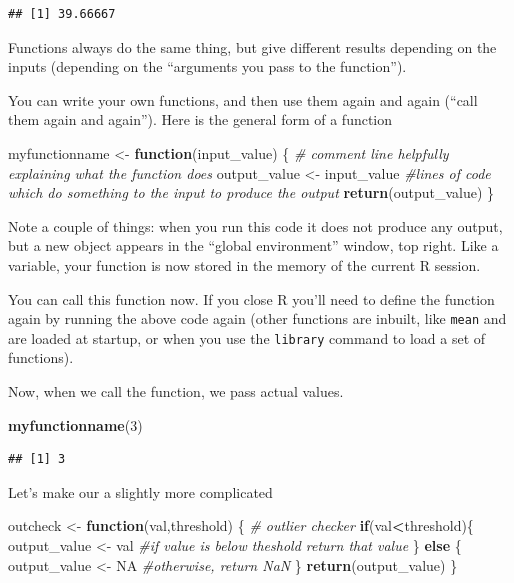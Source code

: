 \documentclass[]{book}
\newenvironment{Shaded}{\begin{snugshade}}{\end{snugshade}}
\newcommand{\KeywordTok}[1]{\textcolor[rgb]{0.13,0.29,0.53}{\textbf{#1}}}
\newcommand{\DecValTok}[1]{\textcolor[rgb]{0.00,0.00,0.81}{#1}}
\newcommand{\StringTok}[1]{\textcolor[rgb]{0.31,0.60,0.02}{#1}}
\newcommand{\CommentTok}[1]{\textcolor[rgb]{0.56,0.35,0.01}{\textit{#1}}}
\newcommand{\OtherTok}[1]{\textcolor[rgb]{0.56,0.35,0.01}{#1}}
\newcommand{\ControlFlowTok}[1]{\textcolor[rgb]{0.13,0.29,0.53}{\textbf{#1}}}
\newcommand{\OperatorTok}[1]{\textcolor[rgb]{0.81,0.36,0.00}{\textbf{#1}}}
\newcommand{\NormalTok}[1]{#1}
\begin{document}
\begin{verbatim}
## [1] 39.66667
\end{verbatim}

Functions always do the same thing, but give different results depending
on the inputs (depending on the ``arguments you pass to the function'').

You can write your own functions, and then use them again and again
(``call them again and again''). Here is the general form of a function

\begin{Shaded}
\begin{Highlighting}[]
\NormalTok{myfunctionname <-}\StringTok{ }\ControlFlowTok{function}\NormalTok{(input_value) \{}
\CommentTok{# comment line helpfully explaining what the function does}
\NormalTok{output_value <-}\StringTok{ }\NormalTok{input_value }\CommentTok{#lines of code which do something to the input to produce the output}
\KeywordTok{return}\NormalTok{(output_value)}
\NormalTok{\}}
\end{Highlighting}
\end{Shaded}

Note a couple of things: when you run this code it does not produce any
output, but a new object appears in the ``global environment'' window,
top right. Like a variable, your function is now stored in the memory of
the current R session.

You can call this function now. If you close R you'll need to define the
function again by running the above code again (other functions are
inbuilt, like \texttt{mean} and are loaded at startup, or when you use
the \texttt{library} command to load a set of functions).

Now, when we call the function, we pass actual values.

\begin{Shaded}
\begin{Highlighting}[]
\KeywordTok{myfunctionname}\NormalTok{(}\DecValTok{3}\NormalTok{)}
\end{Highlighting}
\end{Shaded}

\begin{verbatim}
## [1] 3
\end{verbatim}

Let's make our a slightly more complicated

\begin{Shaded}
\begin{Highlighting}[]
\NormalTok{outcheck <-}\StringTok{ }\ControlFlowTok{function}\NormalTok{(val,threshold) \{}
\CommentTok{# outlier checker}
\ControlFlowTok{if}\NormalTok{(val}\OperatorTok{<}\NormalTok{threshold)\{}
\NormalTok{  output_value <-}\StringTok{ }\NormalTok{val }\CommentTok{#if value is below theshold return that value}
\NormalTok{\} }\ControlFlowTok{else}\NormalTok{ \{}
\NormalTok{  output_value <-}\StringTok{ }\OtherTok{NA} \CommentTok{#otherwise, return NaN}
\NormalTok{\}}
\KeywordTok{return}\NormalTok{(output_value)}
\NormalTok{\}}
\end{Highlighting}
\end{Shaded}
\end{document}
